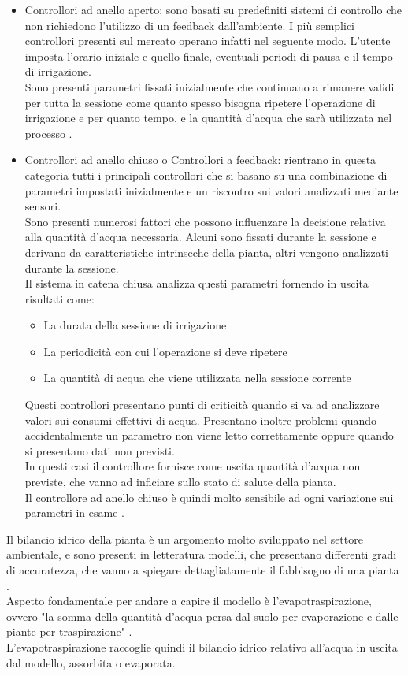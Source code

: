\documentclass[conference,10pt]{IEEEtran}
\begin{document}
\begin{itemize}
	\item Controllori ad anello aperto: sono basati su predefiniti sistemi di controllo che non richiedono l'utilizzo di un feedback dall'ambiente. I più semplici controllori presenti sul mercato operano infatti nel seguente modo. L'utente imposta l'orario iniziale e quello finale, eventuali periodi di pausa e il tempo di irrigazione.\\ 
	Sono presenti parametri fissati inizialmente che continuano a rimanere validi per tutta la sessione come quanto spesso bisogna ripetere l'operazione di irrigazione e per quanto tempo, e la quantità d'acqua che sarà utilizzata nel processo \cite{1}.\\
	\item Controllori ad anello chiuso o Controllori a feedback: rientrano in questa categoria tutti i principali controllori che si basano su una combinazione di parametri impostati inizialmente e un riscontro sui valori analizzati mediante sensori. \\
	Sono presenti numerosi fattori che possono influenzare la decisione relativa alla quantità d'acqua necessaria. Alcuni sono fissati durante la sessione e derivano da caratteristiche intrinseche della pianta, altri vengono analizzati durante la sessione.\\
	Il sistema in catena chiusa analizza questi parametri fornendo in uscita risultati come:
	\begin{itemize}
		\item La durata della sessione di irrigazione
		\item La periodicità con cui l'operazione si deve ripetere
		\item La quantità di acqua che viene utilizzata nella sessione corrente
	\end{itemize}
	Questi controllori presentano punti di criticità quando si va ad analizzare valori sui consumi effettivi di acqua. Presentano inoltre problemi quando accidentalmente un parametro non viene letto correttamente oppure quando si presentano dati non previsti.\\
	In questi casi il controllore fornisce come uscita quantità d'acqua non previste, che vanno ad inficiare sullo stato di salute della pianta.\\ Il controllore ad anello chiuso è quindi molto sensibile ad ogni variazione sui parametri in esame \cite{1}.
	\newline
\end{itemize}
Il bilancio idrico della pianta è un argomento molto sviluppato nel settore ambientale, e sono presenti in letteratura modelli, che presentano differenti gradi di accuratezza, che vanno a spiegare dettagliatamente il fabbisogno di una pianta \cite{11}.\\
Aspetto fondamentale per andare a capire il modello è l'evapotraspirazione, ovvero "la somma della quantità d’acqua persa dal suolo per evaporazione e dalle piante per traspirazione" \cite{6}. \\
L'evapotraspirazione raccoglie quindi il bilancio idrico relativo all'acqua in uscita dal modello, assorbita o evaporata.
\end{document}
